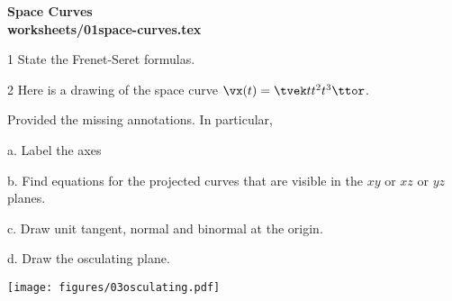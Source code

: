 \begin{center}
    \bfseries\sffamily
    Space Curves\\
    \ttfamily worksheets/01space-curves.tex
\end{center}

\begin{trivlist}
\item[1] State the Frenet-Seret formulas.
\item[2] Here is a drawing of the space curve $\vx(t) = \tvek t\\t^2\\t^3\ttor$.

  Provided the missing annotations.  In particular, 
  \begin{trivlist}
  \item[a.] Label the axes 
  \item[b.] Find equations for the projected curves that are visible in the
    $xy$ or $xz$ or $yz$ planes.
  \item[c.] Draw unit tangent, normal and binormal at the origin.
  \item[d.] Draw the osculating plane.
  \end{trivlist}
\end{trivlist}

\begin{center}
  \texttt{[image: figures/03osculating.pdf]}
\end{center}
